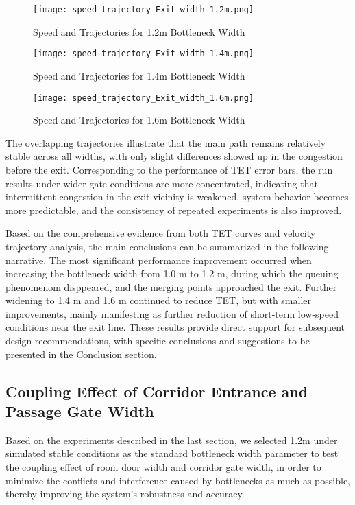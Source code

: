 \begin{figure}[h]
    \centering
    \texttt{[image: speed\_trajectory\_Exit\_width\_1.2m.png]}
    \caption{Speed and Trajectories for 1.2m Bottleneck Width}
    \label{fig:speed_trajectory_layout_1.2m}
\end{figure}

\begin{figure}[h]
    \centering
    \texttt{[image: speed\_trajectory\_Exit\_width\_1.4m.png]}
    \caption{Speed and Trajectories for 1.4m Bottleneck Width}
    \label{fig:speed_trajectory_layout_1.4m}
\end{figure}

\begin{figure}[h]
    \centering
    \texttt{[image: speed\_trajectory\_Exit\_width\_1.6m.png]}
    \caption{Speed and Trajectories for 1.6m Bottleneck Width}
    \label{fig:speed_trajectory_layout_1.6m}
\end{figure}

The overlapping trajectories illustrate that the main path remains relatively stable across all widths, with only slight differences showed up in the congestion before the exit. Corresponding to the performance of TET error bars, the run results under wider gate conditions are more concentrated, indicating that intermittent congestion in the exit vicinity is weakened, system behavior becomes more predictable, and the consistency of repeated experiments is also improved.

Based on the comprehensive evidence from both TET curves and velocity trajectory analysis, the main conclusions can be summarized in the following narrative. The most significant performance improvement occurred when increasing the bottleneck width from 1.0 m to 1.2 m, during which the queuing phenomenom disppeared, and the merging points approached the exit. Further widening to 1.4 m and 1.6 m continued to reduce TET, but with smaller improvements, mainly manifesting as further reduction of short-term low-speed conditions near the exit line.  These results provide direct support for subsequent design recommendations, with specific conclusions and suggestions to be presented in the Conclusion section.

\subsection{Coupling Effect of Corridor Entrance and Passage Gate Width}
Based on the experiments described in the last section, we selected 1.2m under simulated stable conditions as the standard bottleneck width parameter to test the coupling effect of room door width and corridor gate width, in order to minimize the conflicts and interference caused by bottlenecks as much as possible, thereby improving the system's robustness and accuracy.

